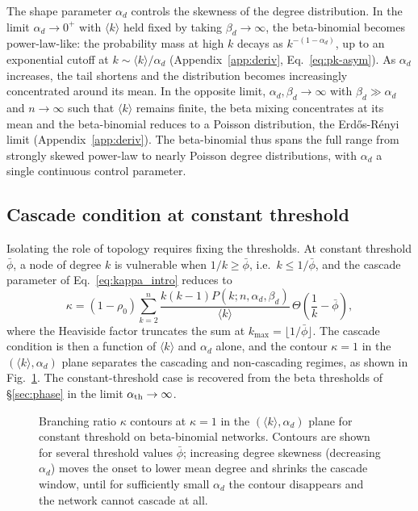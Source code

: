 \documentclass[]{revtex4-2}
\begin{document}
The shape parameter $\alpha_d$ controls the skewness of the degree distribution. In the limit $\alpha_d\to0^+$ with $\langle k\rangle$ held fixed by taking $\beta_d\to\infty$, the beta-binomial becomes power-law-like: the probability mass at high $k$ decays as $k^{-(1-\alpha_d)}$, up to an exponential cutoff at $k \sim \langle k\rangle/\alpha_d$ (Appendix~\ref{app:deriv}, Eq.~\eqref{eq:pk-asym}). As $\alpha_d$ increases, the tail shortens and the distribution becomes increasingly concentrated around its mean. In the opposite limit, $\alpha_d,\beta_d\to\infty$ with $\beta_d\gg\alpha_d$ and $n\to\infty$ such that $\langle k\rangle$ remains finite, the beta mixing concentrates at its mean and the beta-binomial reduces to a Poisson distribution, the Erd\H{o}s-R\'{e}nyi limit (Appendix~\ref{app:deriv}). The beta-binomial thus spans the full range from strongly skewed power-law to nearly Poisson degree distributions, with $\alpha_d$ a single continuous control parameter.

\subsection{Cascade condition at constant threshold}
\label{sec:bb-const}

Isolating the role of topology requires fixing the thresholds. At constant threshold $\bar\phi$, a node of degree $k$ is vulnerable when $1/k\ge\bar\phi$, i.e.\ $k\le 1/\bar\phi$, and the cascade parameter of Eq.~\eqref{eq:kappa_intro} reduces to
\begin{equation}
    \kappa = (1-\rho_0)\sum_{k=2}^n \frac{k(k-1)P(k; n,\alpha_d,\beta_d)}{\langle k\rangle}\,
    \Theta\!\left(\frac{1}{k}-\bar\phi\right),
    \label{eq:bb-const-kappa}
\end{equation}
where the Heaviside factor truncates the sum at $k_{\max}=\lfloor 1/\bar\phi\rfloor$. The cascade condition is then a function of $\langle k\rangle$ and $\alpha_d$ alone, and the contour $\kappa=1$ in the $(\langle k\rangle,\alpha_d)$ plane separates the cascading and non-cascading regimes, as shown in Fig.~\ref{fig:const-bb-contours}. The constant-threshold case is recovered from the beta thresholds of \S\ref{sec:phase} in the limit $\alpha_{\rm th}\to\infty$.

\begin{figure}[t]
\centering
{}
\caption{Branching ratio $\kappa$ contours at $\kappa=1$ in the $(\langle k\rangle,\alpha_d)$ plane for constant threshold on beta-binomial networks. Contours are shown for several threshold values $\bar\phi$; increasing degree skewness (decreasing $\alpha_d$) moves the onset to lower mean degree and shrinks the cascade window, until for sufficiently small $\alpha_d$ the contour disappears and the network cannot cascade at all.}
\label{fig:const-bb-contours}
\end{figure}
\end{document}
